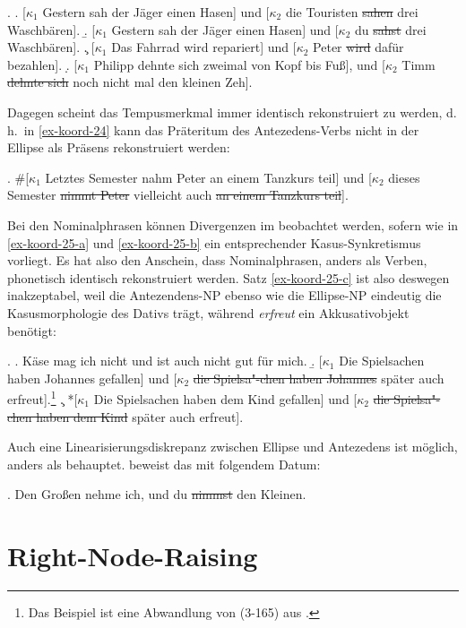 \ex. 
\a. \label{ex-koord-23-a}[$\kappa_1$ Gestern sah der Jäger einen Hasen] und [$\kappa_2$ die Touristen \sout{sahen} drei Waschbären].
\b. \label{ex-koord-23-b}[$\kappa_1$ Gestern sah der Jäger einen Hasen] und [$\kappa_2$ du \sout{sahst} drei Waschbären]. 
\c. \label{ex-koord-23-c}[$\kappa_1$ Das Fahrrad wird repariert] und [$\kappa_2$ Peter \sout{wird} dafür bezahlen].
\d. \label{ex-koord-23-d}[$\kappa_1$ Philipp dehnte sich zweimal von Kopf bis Fuß], und [$\kappa_2$ Timm \sout{dehnte sich} noch nicht mal den kleinen Zeh].    

Dagegen scheint das Tempusmerkmal immer identisch rekonstruiert zu werden, d.\,h.\ in \ref{ex-koord-24} kann das Präteritum des Antezedens-Verbs nicht in der Ellipse als Präsens rekonstruiert werden:

\ex.  \#[$\kappa_1$ Letztes Semester nahm Peter an einem Tanzkurs teil] und [$\kappa_2$ dieses Semester \sout{nimmt Peter} vielleicht auch \sout{an einem Tanzkurs teil}].\label{ex-koord-24}

Bei den Nominalphrasen können Divergenzen im  beobachtet werden, sofern wie in \ref{ex-koord-25-a} und \ref{ex-koord-25-b} ein entsprechender Kasus-Synkretismus vorliegt. Es hat also den Anschein, dass Nominalphrasen, anders als Verben, phonetisch identisch rekonstruiert werden. Satz \ref{ex-koord-25-c} ist also deswegen inakzeptabel, weil die Antezendens-NP ebenso wie die Ellipse-NP eindeutig die Kasusmorphologie des Dativs trägt, während {\it erfreut} ein Akkusativobjekt benötigt:

\ex. \label{ex-koord-25}
\a. Käse mag ich nicht und ist auch nicht gut für mich. \hfill \citep[(36)]{Oirsouw:93}\label{ex-koord-25-a}
\b. [$\kappa_1$ Die Spielsachen haben Johannes gefallen] und [$\kappa_2$ \sout{die Spielsa"-chen haben Johannes} später auch erfreut].\footnote{Das Beispiel ist eine Abwandlung von (3-165) aus \cite{Hesse:Kuestner:85}. }\label{ex-koord-25-b} 
\c. *[$\kappa_1$ Die Spielsachen haben dem Kind gefallen] und [$\kappa_2$ \sout{die Spielsa"-chen haben dem Kind} später auch erfreut].\label{ex-koord-25-c} 

Auch eine Linearisierungsdiskrepanz zwischen Ellipse und Antezedens ist möglich, anders als \cite{Ross:70} behauptet. \cite{Oirsouw:87} beweist das mit folgendem Datum:

\ex. Den Gro\ss en nehme ich, und du \sout{nimmst} den Kleinen. \hfill \citep[262]{Oirsouw:87}



\section{Right-Node-Raising}\label{sec-rnr}

